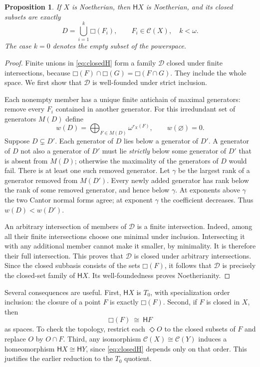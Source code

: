 \documentclass[11pt,a4paper]{article}
\newtheorem{proposition}[proposition]{Proposition}
\theoremstyle{definition}
\newcommand{\Cl}{\mathcal C}
\newcommand{\HH}{\mathsf H}
\newcommand{\boxF}[1]{\mathord{\Box}(#1)}
\newcommand{\natsum}{\mathop{\bigoplus}}
\numberwithin{equation}{section}
\begin{document}
\begin{proposition}\label{prop:closedH}
If $X$ is Noetherian, then $\HH X$ is Noetherian, and its closed subsets
are exactly
\begin{equation}\label{eq:closedH}
 D=\bigcup_{i=1}^k\boxF{F_i},\qquad F_i\in\Cl(X),\quad k<\omega.
\end{equation}
The case $k=0$ denotes the empty subset of the powerspace.
\end{proposition}
\begin{proof}
Finite unions in \eqref{eq:closedH} form a family $\mathcal D$ closed
under finite intersections, because
$\boxF F\cap\boxF G=\boxF{F\cap G}$.  They include the whole space.
We first show that $\mathcal D$ is well-founded under strict inclusion.

Each nonempty member has a unique finite antichain of maximal generators:
remove every $F_i$ contained in another generator.  For this irredundant
set of generators $M(D)$ define
\[
 w(D)=\natsum_{F\in M(D)}\omega^{r_X(F)},\qquad w(\varnothing)=0.
\]
Suppose $D\subsetneq D'$.  Each generator of $D$ lies below a generator
of $D'$.  A generator of $D$ not also a generator of $D'$ must lie
\emph{strictly} below some generator of $D'$ that is absent from $M(D)$;
otherwise the maximality of the generators of $D$ would fail.
There is at least one such removed generator.  Let $\gamma$ be the largest
rank of a generator removed from $M(D')$.  Every newly added generator
has rank below the rank of some removed generator, and hence below
$\gamma$.  At exponents above $\gamma$ the two Cantor normal forms agree;
at exponent $\gamma$ the coefficient decreases.  Thus $w(D)<w(D')$.

An arbitrary intersection of members of $\mathcal D$ is a finite
intersection.  Indeed, among all their finite intersections choose one
minimal under inclusion.  Intersecting it with any additional member
cannot make it smaller, by minimality.  It is therefore their full
intersection.  This proves that $\mathcal D$ is closed under arbitrary
intersections.  Since the closed subbasis consists of the sets
$\boxF F$, it follows that $\mathcal D$ is precisely the closed-set
family of $\HH X$.  Its well-foundedness proves Noetherianity.
\end{proof}

Several consequences are useful.  First, $\HH X$ is $T_0$, with
specialization order inclusion: the closure of a point $F$ is exactly
$\boxF F$.  Second, if $F$ is closed in $X$, then
\begin{equation}\label{eq:principalH}
 \boxF F\ \cong\ \HH F
\end{equation}
as spaces.  To check the topology, restrict each $\Diamond O$ to the
closed subsets of $F$ and replace $O$ by $O\cap F$.
Third, any isomorphism $\Cl(X)\cong\Cl(Y)$ induces a homeomorphism
$\HH X\cong\HH Y$, since \eqref{eq:closedH} depends only on that order.
This justifies the earlier reduction to the $T_0$ quotient.
\end{document}
